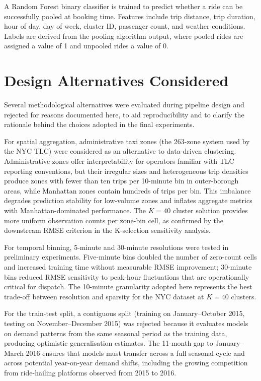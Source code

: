 A Random Forest binary classifier is trained to predict whether a ride can be successfully pooled at booking time. Features include trip distance, trip duration, hour of day, day of week, cluster ID, passenger count, and weather conditions. Labels are derived from the pooling algorithm output, where pooled rides are assigned a value of 1 and unpooled rides a value of 0.

\section{Design Alternatives Considered}

Several methodological alternatives were evaluated during pipeline design and rejected for reasons documented here, to aid reproducibility and to clarify the rationale behind the choices adopted in the final experiments.

For spatial aggregation, administrative taxi zones (the 263-zone system used by the NYC TLC) were considered as an alternative to data-driven clustering. Administrative zones offer interpretability for operators familiar with TLC reporting conventions, but their irregular sizes and heterogeneous trip densities produce zones with fewer than ten trips per 10-minute bin in outer-borough areas, while Manhattan zones contain hundreds of trips per bin. This imbalance degrades prediction stability for low-volume zones and inflates aggregate metrics with Manhattan-dominated performance. The $K{=}40$ cluster solution provides more uniform observation counts per zone-bin cell, as confirmed by the downstream RMSE criterion in the K-selection sensitivity analysis.

For temporal binning, 5-minute and 30-minute resolutions were tested in preliminary experiments. Five-minute bins doubled the number of zero-count cells and increased training time without measurable RMSE improvement; 30-minute bins reduced RMSE sensitivity to peak-hour fluctuations that are operationally critical for dispatch. The 10-minute granularity adopted here represents the best trade-off between resolution and sparsity for the NYC dataset at $K{=}40$ clusters.

For the train-test split, a contiguous split (training on January--October 2015, testing on November--December 2015) was rejected because it evaluates models on demand patterns from the same seasonal period as the training data, producing optimistic generalisation estimates. The 11-month gap to January--March 2016 ensures that models must transfer across a full seasonal cycle and across potential year-on-year demand shifts, including the growing competition from ride-hailing platforms observed from 2015 to 2016.

